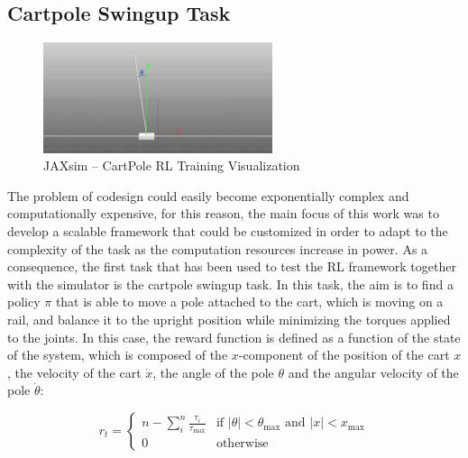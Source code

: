 
\subsection{Cartpole Swingup Task}

\begin{figure}
    \centering
    \caption{JAXsim -- CartPole RL Training Visualization}
    \label{fig:cartpole}
    \includegraphics[width=0.6\textwidth]{Images/cartpole.png}
\end{figure}

The problem of codesign could easily become exponentially complex and computationally expensive, for this reason, the main focus of this work was to develop a scalable framework that could be customized in order to adapt to the complexity of the task as the computation resources increase in power. As a consequence, the first task that has been used to test the \ac{RL} framework together with the \jaxsim simulator is the cartpole swingup task. In this task, the aim is to find a policy $\pi$ that is able to move a pole attached to the cart, which is moving on a rail, and balance it to the upright position while minimizing the torques applied to the joints. In this case, the reward function is defined as a function of the state of the system, which is composed of the $x$-component of the position of the cart $x$, the velocity of the cart $\dot{x}$, the angle of the pole $\theta$ and the angular velocity of the pole $\dot{\theta}$:

\begin{equation}
    r _t = \begin{cases}
        n - \sum _i ^n \frac{\tau _i}{\tau _{\text{max}}} & \text{if } \left| \theta \right| < \theta_{\text{max}} \text{ and } \left| x \right| < x_{\text{max}} \\
        0                                                 & \text{otherwise}
    \end{cases}
\end{equation}

